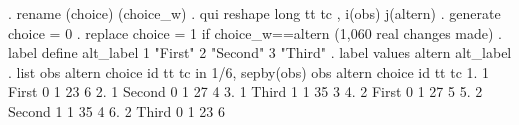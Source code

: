 . rename (choice)  (choice_w)
{\smallskip}
. qui reshape long tt tc  , i(obs) j(altern)
{\smallskip}
. generate choice = 0
{\smallskip}
. replace  choice = 1 if  choice_w==altern  
(1,060 real changes made)
{\smallskip}
. label define  alt_label 1 "First" 2 "Second" 3 "Third" 
{\smallskip}
. label values  altern alt_label
{\smallskip}
. list obs altern choice id  tt tc   in 1/6, sepby(obs)
{\smallskip}
     {\TLC}
     {\VBAR} obs   altern   choice   id   tt   tc {\VBAR}
     {\LFTT}
  1. {\VBAR}   1    First        0    1   23    6 {\VBAR}
  2. {\VBAR}   1   Second        0    1   27    4 {\VBAR}
  3. {\VBAR}   1    Third        1    1   35    3 {\VBAR}
     {\LFTT}
  4. {\VBAR}   2    First        0    1   27    5 {\VBAR}
  5. {\VBAR}   2   Second        1    1   35    4 {\VBAR}
  6. {\VBAR}   2    Third        0    1   23    6 {\VBAR}
     {\BLC}
